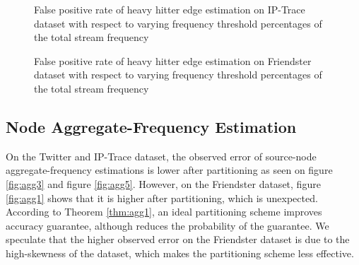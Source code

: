 \begin{figure}[!htbp]
\centering
{}
\caption{False positive rate of heavy hitter edge estimation on IP-Trace dataset with respect to varying frequency threshold percentages of the total stream frequency} \label{fig:EE1}
\end{figure}

\begin{figure}[!htbp]
\centering
{}
\caption{False positive rate of heavy hitter edge estimation on Friendster dataset with respect to varying frequency threshold percentages of the total stream frequency} \label{fig:EE2}
\end{figure}

\clearpage
\subsection{Node Aggregate-Frequency Estimation}

On the Twitter and IP-Trace dataset, the observed error of source-node aggregate-frequency estimations is lower after partitioning as seen on figure \ref{fig:agg3} and figure \ref{fig:agg5}. However, on the Friendster dataset, figure \ref{fig:agg1} shows that it is higher after partitioning, which is unexpected. According to Theorem \ref{thm:agg1}, an ideal partitioning scheme improves accuracy guarantee, although reduces the probability of the guarantee. We speculate that the higher observed error on the Friendster dataset is due to the high-skewness of the dataset, which makes the partitioning scheme less effective.

